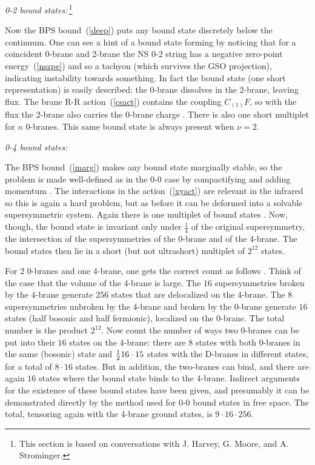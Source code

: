 \documentclass[12pt]{article}
\def\ha{{\textstyle{1\over 2}}}
\begin{document}
{\it 0-2 bound states:}\,\footnote
{This section is based on conversations with 
J. Harvey, G. Moore, and A. Strominger.}

Now the BPS bound~(\ref{deep}) puts any bound
state discretely below the continuum.  One can see a hint of a bound state
forming by noticing that for a coincident 0-brane and 2-brane the NS 0-2
string has a negative zero-point energy~(\ref{nszpe}) and so a tachyon
(which survives the GSO projection), indicating instability towards
something.  In fact the bound state (one short representation) is easily
described: the 0-brane dissolves in the 2-brane, leaving  flux.  The brane R-R
action~(\ref{csact}) contains the coupling
$C_{(1)} F$, so with the flux the 2-brane also carries the 0-brane
charge \cite{towndf}. There is also one short multiplet for $n$ 0-branes.  This
same bound state is always present when $\nu = 2$.

{\it 0-4 bound states:} 

The BPS bound~(\ref{marg}) makes any bound state
marginally stable, so the problem is made well-defined as in the 0-0 case by
compactifying and adding momentum \cite{senbound2}.  The interactions in the
action~(\ref{xyact}) are relevant in the infrared so this is again a hard
problem, but as before it can be deformed into a solvable supersymmetric
system.  Again there is one multiplet of bound states \cite{senbound2}.
Now, though, the bound state is invariant only under $\frac{1}{4}$ of the
original supersymmetry, the intersection of the supersymmetries of the
0-brane and of the 4-brane.  The bound states then lie in a short (but not
ultrashort) multiplet of $2^{12}$ states.

For $2$ 0-branes and one 4-brane, one gets the correct count as
follows \cite{vafa1}. Think of the case that the volume of the 4-brane is
large.  The $16$ supersymmetries broken by the 4-brane generate $256$ states
that are  delocalized on the 4-brane.  The 8 supersymmetries unbroken by the
4-brane  and broken by the 0-brane generate $16$ states (half bosonic and
half fermionic), localized on the 0-brane. The total number is the product
$2^{12}$.  Now count the number of ways two 0-branes can be put into their
$16$ states on the 4-brane: there are $8$ states with both 0-branes in the
same (bosonic) state and $\ha 16\cdot 15$ states with the D-branes in
different states, for a total of $8\cdot 16$ states.  But in addition, the
two-branes can bind, and there are again $16$ states where the bound state
binds to the 4-brane.  Indirect arguments for the existence of these bound
states have been given, \cite{vafa1} and presumably it
can be demonstrated directly by the
method used for 0-0 bound states in
free space.  The total,
tensoring again with the 4-brane ground states, is $9 \cdot 16 \cdot 256$.
\end{document}

